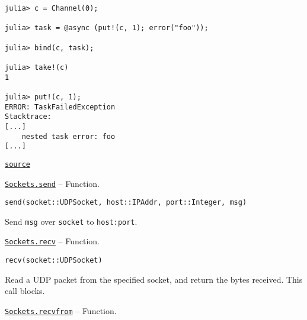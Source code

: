 \begin{adjustwidth}{2em}{0pt}
\begin{verbatim}
julia> c = Channel(0);

julia> task = @async (put!(c, 1); error("foo"));

julia> bind(c, task);

julia> take!(c)
1

julia> put!(c, 1);
ERROR: TaskFailedException
Stacktrace:
[...]
    nested task error: foo
[...]
\end{verbatim}



\href{https://github.com/JuliaLang/julia/blob/9058264a69f9efc1af805c4473c946f87859b731/base/channels.jl#L197-L248}{\texttt{source}}


\end{adjustwidth}
\hypertarget{14996317088638800111}{}
\hyperlink{14996317088638800111}{\texttt{Sockets.send}}  -- {Function.}

\begin{adjustwidth}{2em}{0pt}


\begin{verbatim}
send(socket::UDPSocket, host::IPAddr, port::Integer, msg)
\end{verbatim}

Send \texttt{msg} over \texttt{socket} to \texttt{host:port}.



\end{adjustwidth}
\hypertarget{8720184196970920051}{}
\hyperlink{8720184196970920051}{\texttt{Sockets.recv}}  -- {Function.}

\begin{adjustwidth}{2em}{0pt}


\begin{verbatim}
recv(socket::UDPSocket)
\end{verbatim}

Read a UDP packet from the specified socket, and return the bytes received. This call blocks.



\end{adjustwidth}
\hypertarget{10286416413585635173}{}
\hyperlink{10286416413585635173}{\texttt{Sockets.recvfrom}}  -- {Function.}

